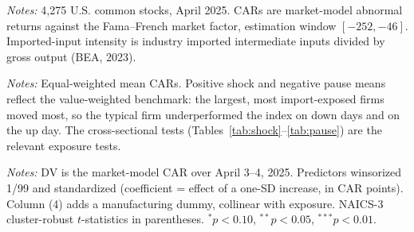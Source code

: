 \documentclass[12pt]{article}
\begin{document}
\FloatBarrier
\newpage
\begin{table}[htbp]\centering
\begin{threeparttable}
\caption{Summary statistics}\label{tab:sumstats}\small

\begin{tablenotes}\small\item \textit{Notes:} 4{,}275 U.S. common stocks, April 2025.
CARs are market-model abnormal returns against the Fama--French market factor, estimation
window $[-252,-46]$. Imported-input intensity is industry imported intermediate inputs
divided by gross output (BEA, 2023).
\end{tablenotes}
\end{threeparttable}
\end{table}

\begin{table}[htbp]\centering
\begin{threeparttable}
\caption{Mean cumulative abnormal returns by window}\label{tab:cars}\small

\begin{tablenotes}\small\item \textit{Notes:} Equal-weighted mean CARs. Positive shock and
negative pause means reflect the value-weighted benchmark: the largest, most import-exposed
firms moved most, so the typical firm underperformed the index on down days and on the up
day. The cross-sectional tests (Tables~\ref{tab:shock}--\ref{tab:pause}) are the relevant
exposure tests.
\end{tablenotes}
\end{threeparttable}
\end{table}

\begin{table}[htbp]\centering
\begin{threeparttable}
\caption{Tariff SHOCK: CAR[Apr 3, Apr 4] on imported-input intensity}\label{tab:shock}\small

\begin{tablenotes}\small\item \textit{Notes:} DV is the market-model CAR over April 3--4,
2025. Predictors winsorized 1/99 and standardized (coefficient = effect of a one-SD
increase, in CAR points). Column (4) adds a manufacturing dummy, collinear with exposure.
NAICS-3 cluster-robust $t$-statistics in parentheses.
$^{*}p<0.10$, $^{**}p<0.05$, $^{***}p<0.01$.
\end{tablenotes}
\end{threeparttable}
\end{table}
\end{document}
